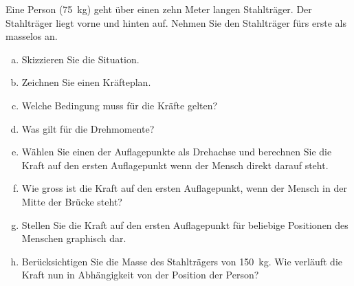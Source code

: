 
\begin{aufgabe}
	Eine Person (\SI{75}{kg}) geht über einen zehn Meter langen Stahlträger. Der Stahlträger liegt vorne und hinten auf.
 Nehmen Sie den Stahlträger fürs erste als masselos an.
\begin{enumerate} [a)]
\item Skizzieren Sie die Situation.
\item Zeichnen Sie einen Kräfteplan.
\item Welche Bedingung muss für die Kräfte gelten?
\item Was gilt für die Drehmomente?
\item Wählen Sie einen der Auflagepunkte als Drehachse und berechnen Sie die Kraft auf den ersten Auflagepunkt wenn der Mensch direkt darauf steht.
\item Wie gross ist die Kraft auf den ersten Auflagepunkt, wenn der Mensch in der Mitte der Brücke steht?
\item Stellen Sie die Kraft auf den ersten Auflagepunkt für beliebige Positionen des Menschen graphisch dar.
	\item Berücksichtigen Sie die Masse des Stahlträgers von \SI{150}{kg}. Wie verläuft die Kraft nun in Abhängigkeit von der Position der Person?
\end{enumerate}
\end{aufgabe}
\begin{loesung}

\end{loesung}

